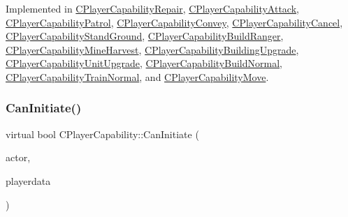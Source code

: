 Implemented in \hyperlink{classCPlayerCapabilityRepair_ae989c67c5e14bbba5b2ddda993ee635a}{C\+Player\+Capability\+Repair}, \hyperlink{classCPlayerCapabilityAttack_ab5cdd55fa3838304fd551426e41f7b17}{C\+Player\+Capability\+Attack}, \hyperlink{classCPlayerCapabilityPatrol_a63c099d931e1e57db01120db7b1fdbe4}{C\+Player\+Capability\+Patrol}, \hyperlink{classCPlayerCapabilityConvey_a795b3eb4c3879a6d7da1cba7962a1c78}{C\+Player\+Capability\+Convey}, \hyperlink{classCPlayerCapabilityCancel_a0221e4e768c998cb46f1dbc757647ec1}{C\+Player\+Capability\+Cancel}, \hyperlink{classCPlayerCapabilityStandGround_a468f2618edaebf2088b5917d2688b6f6}{C\+Player\+Capability\+Stand\+Ground}, \hyperlink{classCPlayerCapabilityBuildRanger_a2e688d8f68ab53402afe9303dd28754a}{C\+Player\+Capability\+Build\+Ranger}, \hyperlink{classCPlayerCapabilityMineHarvest_a31da799cc9bc9be9f986bd878d13283a}{C\+Player\+Capability\+Mine\+Harvest}, \hyperlink{classCPlayerCapabilityBuildingUpgrade_a22de7902bcf6406a3b3a7c51e5c56f35}{C\+Player\+Capability\+Building\+Upgrade}, \hyperlink{classCPlayerCapabilityUnitUpgrade_a93d1a57f2cc52b90ce6cb714717bfefd}{C\+Player\+Capability\+Unit\+Upgrade}, \hyperlink{classCPlayerCapabilityBuildNormal_a1a8c6fdd9d8a91ecb7417163279e2276}{C\+Player\+Capability\+Build\+Normal}, \hyperlink{classCPlayerCapabilityTrainNormal_a625d2154bed47357f45662fe5dee7c1b}{C\+Player\+Capability\+Train\+Normal}, and \hyperlink{classCPlayerCapabilityMove_a76cbb0fa4051961c00e3169d11d76568}{C\+Player\+Capability\+Move}.

\hypertarget{classCPlayerCapability_aa83b1e1fcaff2985c378132d679154ea}{}\label{classCPlayerCapability_aa83b1e1fcaff2985c378132d679154ea} 
\subsubsection{\texorpdfstring{Can\+Initiate()}{CanInitiate()}}
{\footnotesize\ttfamily virtual bool C\+Player\+Capability\+::\+Can\+Initiate (\begin{DoxyParamCaption}\item[{std\+::shared\+\_\+ptr$<$ \hyperlink{classCPlayerAsset}{C\+Player\+Asset} $>$}]{actor,  }\item[{std\+::shared\+\_\+ptr$<$ \hyperlink{classCPlayerData}{C\+Player\+Data} $>$}]{playerdata }\end{DoxyParamCaption})\hspace{0.3cm}{\ttfamily [pure virtual]}}



